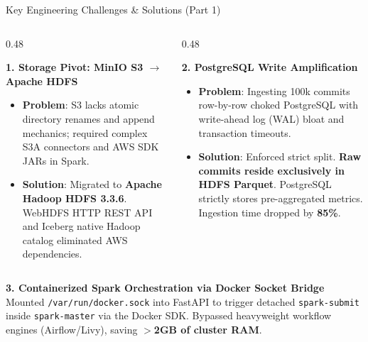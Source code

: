 \documentclass[aspectratio=169, 10pt]{beamer}
\begin{document}
\begin{frame}{Key Engineering Challenges \& Solutions (Part 1)}
  \begin{columns}[T]
    \begin{column}{0.48\textwidth}
      \begin{alertblock}{\textbf{1. Storage Pivot: MinIO S3 $\to$ Apache HDFS}}
        \begin{itemize}
          \item \textbf{Problem}: S3 lacks atomic directory renames and append mechanics; required complex S3A connectors and AWS SDK JARs in Spark.
          \item \textbf{Solution}: Migrated to \textbf{Apache Hadoop HDFS 3.3.6}. WebHDFS HTTP REST API and Iceberg native Hadoop catalog eliminated AWS dependencies.
        \end{itemize}
      \end{alertblock}
    \end{column}

    \begin{column}{0.48\textwidth}
      \begin{alertblock}{\textbf{2. PostgreSQL Write Amplification}}
        \begin{itemize}
          \item \textbf{Problem}: Ingesting 100k commits row-by-row choked PostgreSQL with write-ahead log (WAL) bloat and transaction timeouts.
          \item \textbf{Solution}: Enforced strict split. \textbf{Raw commits reside exclusively in HDFS Parquet}. PostgreSQL strictly stores pre-aggregated metrics. Ingestion time dropped by \textbf{85\%}.
        \end{itemize}
      \end{alertblock}
    \end{column}
  \end{columns}
  \vspace{0.2cm}
  \begin{exampleblock}{\textbf{3. Containerized Spark Orchestration via Docker Socket Bridge}}
    Mounted \texttt{/var/run/docker.sock} into FastAPI to trigger detached \texttt{spark-submit} inside \texttt{spark-master} via the Docker SDK. Bypassed heavyweight workflow engines (Airflow/Livy), saving \textbf{$>$2GB of cluster RAM}.
  \end{exampleblock}
\end{frame}
\end{document}
